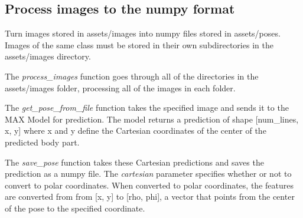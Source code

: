 \documentclass[11pt]{article}
\begin{document}
    \subsection{Process images to the numpy
format}\label{process-images-to-the-numpy-format}

Turn images stored in assets/images into numpy files stored in
assets/poses. Images of the same class must be stored in their own
subdirectories in the assets/images directory.

The \emph{process\_images} function goes through all of the directories
in the assets/images folder, processing all of the images in each
folder.

The \emph{get\_pose\_from\_file} function takes the specified image and
sends it to the MAX Model for prediction. The model returns a prediction
of shape {[}num\_lines, x, y{]} where x and y define the Cartesian
coordinates of the center of the predicted body part.

The \emph{save\_pose} function takes these Cartesian predictions and
saves the prediction as a numpy file. The \emph{cartesian} parameter
specifies whether or not to convert to polar coordinates. When converted
to polar coordinates, the features are converted from from {[}x, y{]} to
{[}rho, phi{]}, a vector that points from the center of the pose to the
specified coordinate.
\end{document}
